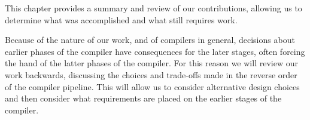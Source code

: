 This chapter provides a summary and review of our contributions, allowing us to
determine what was accomplished and what still requires work.

Because of the nature of our work, and of compilers in general, decisions
about earlier phases of the compiler have consequences for the later
stages, often forcing the hand of the latter phases of the compiler.
For this reason we will review our work backwards, discussing the choices
and trade-offs made in the reverse order of the compiler pipeline. This will
allow us to consider alternative design choices and then consider what
requirements are placed on the earlier stages of the compiler.
